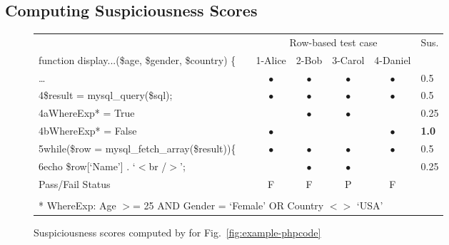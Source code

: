\subsection{Computing Suspiciousness Scores}

\begin{figure}[t]
    \centering
    \footnotesize
    \setlength{\tabcolsep}{1pt}
    \renewcommand{\arraystretch}{1.1}
{\sffamily
 \scriptsize
\begin{tabular}{ll@{}ccccl@{}}
    \toprule
                   & & \multicolumn{4}{c}{Row-based test case} & Sus.\\
    \cmidrule{1-1}                                                                  \cmidrule{3-6}
    function display...(\$age, \$gender, \$country) \{                    & & 1-Alice             & 2-Bob             & 3-Carol   & 4-Daniel \\
    \ldots                                                                          & & $\bullet$     & $\bullet$     & $\bullet$     & $\bullet$   & 0.5\\
    4\hspace{5pt}\$result = mysql\_query(\$sql);                                   & & $\bullet$     & $\bullet$     & $\bullet$     & $\bullet$   & 0.5\\
    4a\hspace{30pt}WhereExp* = True             & &               & $\bullet$     & $\bullet$     &    & 0.25\\
    4b\hspace{30pt}WhereExp* = False                                           & & $\bullet$     &               &   & $\bullet$   & \textbf{1.0}\\
    5\hspace{5pt}while(\$row = mysql\_fetch\_array(\$result))\{                   & & $\bullet$  & $\bullet$     & $\bullet$     &  $\bullet$ & 0.5\\
    6\hspace{20pt}echo \$row[`Name'] . `$<$br /$>$';                                    & &         & $\bullet$     & $\bullet$     &  & 0.25\\
    \midrule
    Pass/Fail Status                                                                & & F             & F             & P             & F \\
    \bottomrule
    \addlinespace
    \multicolumn{6}{l}{Test case with \$age = 25, \$gender = `Female', \$country = `USA'}\\
    \multicolumn{6}{l}{* WhereExp: Age $>$= 25 AND Gender = `Female' OR Country $<>$ `USA'}
\end{tabular}
}
    \caption{Suspiciousness scores computed by \tool{} for Fig.~\ref{fig:example-phpcode}}\label{fig:suspiciousness-improved}
\end{figure}

